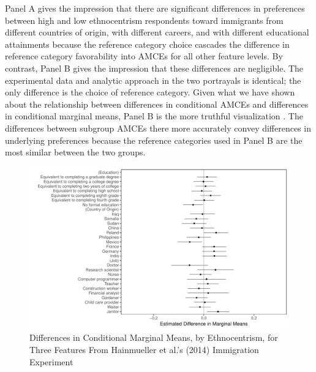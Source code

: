 \documentclass[a4paper,12pt]{article}\usepackage[]{graphicx}\usepackage[]{color}
\makeatletter
\def\maxwidth{ %
  \ifdim\Gin@nat@width>\linewidth
    \linewidth
  \else
    \Gin@nat@width
  \fi
}
\newenvironment{knitrout}{}{} %
\makeatother
\begin{document}
Panel A gives the impression that there are significant differences in preferences between high and low ethnocentrism respondents toward immigrants from different countries of origin, with different careers, and with different educational attainments because the reference category choice cascades the difference in reference category favorability into AMCEs for all other feature levels. By contrast, Panel B gives the impression that these differences are negligible. The experimental data and analytic approach in the two portrayals is identical; the only difference is the choice of reference category. Given what we have shown about the relationship between differences in conditional AMCEs and differences in conditional marginal means, Panel B is the more truthful visualization \citep{Cairo2016}. The differences between subgroup AMCEs there more accurately convey differences in underlying preferences because the reference categories used in Panel B are the most similar between the two groups.

\begin{knitrout}
\color{fgcolor}\begin{figure}
\includegraphics[width=\maxwidth]{figure/hainmueller_mm_diffs-1} \caption[Differences in Conditional Marginal Means, by Ethnocentrism, for Three Features From Hainmueller et al.'s (2014) Immigration Experiment]{Differences in Conditional Marginal Means, by Ethnocentrism, for Three Features From Hainmueller et al.'s (2014) Immigration Experiment}\label{fig:hainmueller_mm_diffs}
\end{figure}


\end{knitrout}
\end{document}
